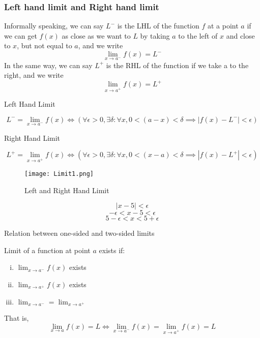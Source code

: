 
\subsubsection{Left hand limit and Right hand limit}

Informally speaking, we can say $L^-$ is the LHL of the function $f$ at a point $a$ if we can get $f(x)$ as close as we want to $L$ by taking $a$ to the left of $x$ and close to $x$, but not equal to $a$, and we write \[
    \lim_{x \to a^-} f(x) = L^-
    \] In the same way, we can say $L^+$ is the RHL of the function if we take a to the right, and we write \[
    \lim_{x \to a^+} f(x) = L^+
\]

\begin{definition}{Left Hand Limit}

    \[ L^- = \lim_{x \to a^-} f(x) \iff \left( \forall\epsilon>0,\exists\delta : \forall x, 0<(a-x)<\delta \implies |f(x)-L^-|<\epsilon \right) \]
\end{definition}
\begin{definition}{Right Hand Limit}

\[
    L^+ = \lim_{x \to a^+} f(x) \iff \left( \forall\epsilon>0,\exists\delta : \forall x, 0<(x-a)<\delta \implies |f(x)-L^+|<\epsilon \right) 
\]
\end{definition}

\begin{figure}[htpb]
    \centering
    \texttt{[image: Limit1.png]}
    \caption{\small Left and Right Hand Limit}
\end{figure}
\[ |x-5| < \epsilon \]
\[ -\epsilon < x-5 < \epsilon \]
\[ 5-\epsilon < x < 5+\epsilon \]

\begin{theorem}{Relation between one-sided and two-sided limits}
    
    Limit of a function at point $a$ exists if:
    \begin{enumerate}[(i)]
        \item $\lim_{x \to a^-} f(x)$ exists
        \item $\lim_{x \to a^+} f(x)$ exists
        \item $\lim_{x \to a^-} = \lim_{x \to a^+}$ 
    \end{enumerate}
    That is, \[
        \lim_{x \to a} f(x) = L \iff \lim_{x \to a^-} f(x) = \lim_{x \to a^+} f(x) = L 
    \]
\end{theorem} \\~\\

